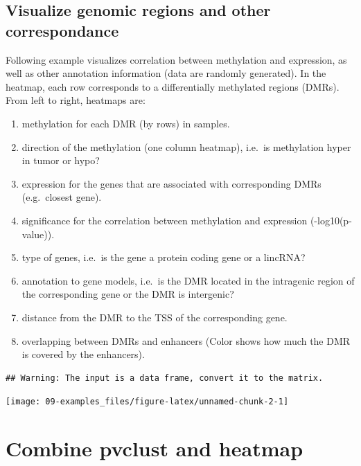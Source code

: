\documentclass[]{book}
\providecommand{\tightlist}{%
  \setlength{\itemsep}{0pt}\setlength{\parskip}{0pt}}
\theoremstyle{definition}
\theoremstyle{definition}
\theoremstyle{definition}
\theoremstyle{remark}
\begin{document}
\subsection{Visualize genomic regions and other
correspondance}\label{visualize-genomic-regions-and-other-correspondance}

Following example visualizes correlation between methylation and
expression, as well as other annotation information (data are randomly
generated). In the heatmap, each row corresponds to a differentially
methylated regions (DMRs). From left to right, heatmaps are:

\begin{enumerate}
\def\labelenumi{\arabic{enumi}.}
\tightlist
\item
  methylation for each DMR (by rows) in samples.
\item
  direction of the methylation (one column heatmap), i.e.~is methylation
  hyper in tumor or hypo?
\item
  expression for the genes that are associated with corresponding DMRs
  (e.g.~closest gene).
\item
  significance for the correlation between methylation and expression
  (-log10(p-value)).
\item
  type of genes, i.e.~is the gene a protein coding gene or a lincRNA?
\item
  annotation to gene models, i.e.~is the DMR located in the intragenic
  region of the corresponding gene or the DMR is intergenic?
\item
  distance from the DMR to the TSS of the corresponding gene.
\item
  overlapping between DMRs and enhancers (Color shows how much the DMR
  is covered by the enhancers).
\end{enumerate}

\begin{verbatim}
## Warning: The input is a data frame, convert it to the matrix.
\end{verbatim}

\begin{center}\texttt{[image: 09-examples\_files/figure-latex/unnamed-chunk-2-1]} \end{center}

\section{Combine pvclust and heatmap}\label{combine-pvclust-and-heatmap}
\end{document}

